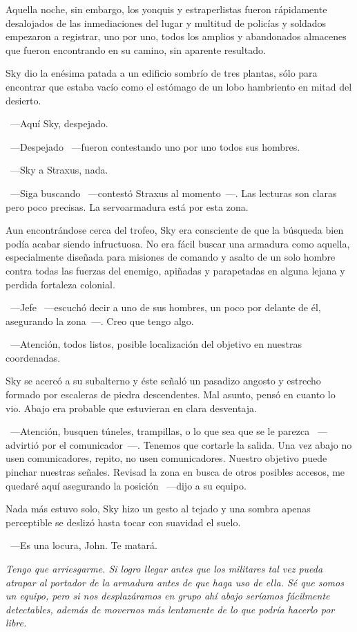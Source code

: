 Aquella noche, sin embargo, los yonquis y estraperlistas fueron rápidamente desalojados de las inmediaciones del lugar y multitud de policías y soldados empezaron a registrar, uno por uno, todos los amplios y abandonados almacenes que fueron encontrando en su camino, sin aparente resultado.

Sky dio la enésima patada a un edificio sombrío de tres plantas, sólo para encontrar que estaba vacío como el estómago de un lobo hambriento en mitad del desierto.

~---Aquí Sky, despejado.

~---Despejado ~---fueron contestando uno por uno todos sus hombres.

~---Sky a Straxus, nada.

~---Siga buscando ~---contestó Straxus al momento~---. Las lecturas son claras pero poco precisas. La servoarmadura está por esta zona.

Aun encontrándose cerca del trofeo, Sky era consciente de que la búsqueda bien podía acabar siendo infructuosa. No era fácil buscar una armadura como aquella, especialmente diseñada para misiones de comando y asalto de un solo hombre contra todas las fuerzas del enemigo, apiñadas y parapetadas en alguna lejana y perdida fortaleza colonial.

~---Jefe ~---escuchó decir a uno de sus hombres, un poco por delante de él, asegurando la zona~---. Creo que tengo algo.

~---Atención, todos listos, posible localización del objetivo en nuestras coordenadas.

Sky se acercó a su subalterno y éste señaló un pasadizo angosto y estrecho formado por escaleras de piedra descendentes. Mal asunto, pensó en cuanto lo vio. Abajo era probable que estuvieran en clara desventaja.

~---Atención, busquen túneles, trampillas, o lo que sea que se le parezca ~---advirtió por el comunicador~---. Tenemos que cortarle la salida. Una vez abajo no usen comunicadores, repito, no usen comunicadores. Nuestro objetivo puede pinchar nuestras señales. Revisad la zona en busca de otros posibles accesos, me quedaré aquí asegurando la posición ~---dijo a su equipo.

Nada más estuvo solo, Sky hizo un gesto al tejado y una sombra apenas perceptible se deslizó hasta tocar con suavidad el suelo.

~---Es una locura, John. Te matará.

\emph{Tengo que arriesgarme. Si logro llegar antes que los militares tal vez pueda atrapar al portador de la armadura antes de que haga uso de ella. Sé que somos un equipo, pero si nos desplazáramos en grupo ahí abajo seríamos fácilmente detectables, además de movernos más lentamente de lo que podría hacerlo por libre.}

